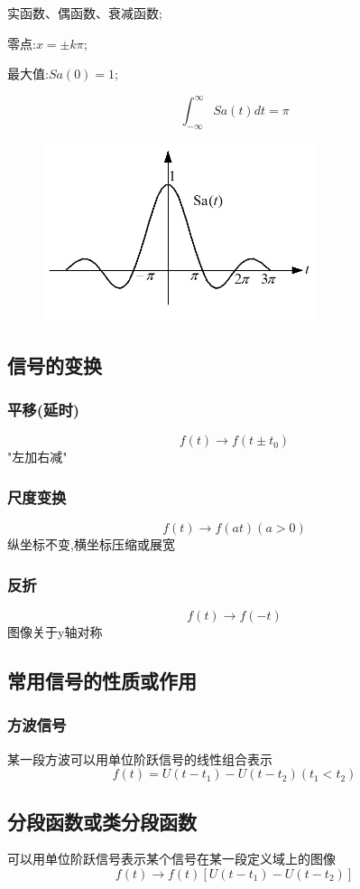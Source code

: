 \documentclass[12pt, a4paper, oneside]{ctexart}
\begin{document}
实函数、偶函数、衰减函数;

零点:$x=\pm k\pi$;

最大值:$Sa(0)=1$;

\[
    \int_{-\infty}^{\infty}Sa(t)dt=\pi
\]
\begin{figure}[htbp]
    \centering
    \includegraphics[width=8cm]{photos/抽样函数.jpg}
\end{figure}

\subsection{信号的变换}
\subsubsection{平移(延时)}
\[
    f(t) \to f(t\pm t_0)
\]
"左加右减"

\subsubsection{尺度变换}
\[
    f(t)\to f(at)(a>0)
\]
纵坐标不变,横坐标压缩或展宽

\subsubsection{反折}
\[
    f(t)\to f(-t)
\]
图像关于y轴对称

\subsection{常用信号的性质或作用}
\subsubsection{方波信号}
某一段方波可以用单位阶跃信号的线性组合表示
\[
    f(t) = U(t-t_1) - U(t-t_2)(t_1<t_2)
\]

\subsection{分段函数或类分段函数}
可以用单位阶跃信号表示某个信号在某一段定义域上的图像
\[
    f(t)\to f(t)[U(t-t_1) - U(t-t_2)]
\]
\end{document}
